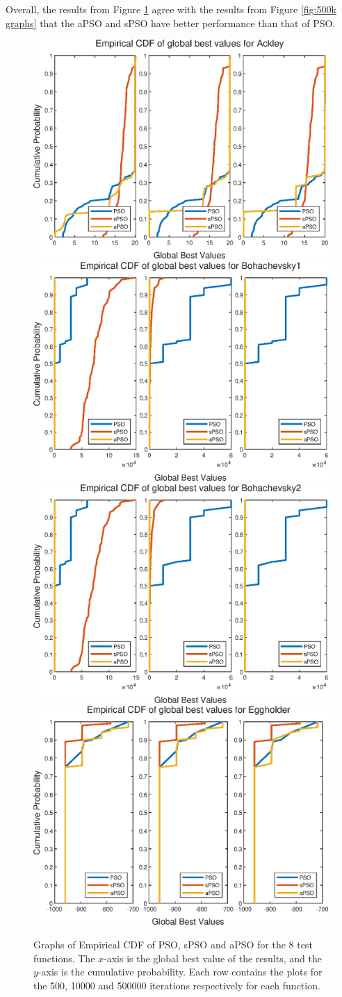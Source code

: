 \documentclass[12pt]{article}
\theoremstyle{definition}
\begin{document}
Overall, the results from Figure \ref{fig:ecdf graphs} agree with the results from Figure \ref{fig:500k graphs} that the aPSO and sPSO have better performance than that of PSO.

\begin{figure}[H]
    \centering
    \includegraphics[height=0.33\textwidth,width=\textwidth]{ecdfs/Ackley_500k.eps} \\ \bigskip
    \includegraphics[height=0.33\textwidth,width=\textwidth]{ecdfs/Bohachevsky1_500k.eps} \\ \bigskip
    \includegraphics[height=0.33\textwidth,width=\textwidth]{ecdfs/Bohachevsky2_500k.eps} \\ \bigskip
    \includegraphics[height=0.33\textwidth,width=\textwidth]{ecdfs/Eggholder_500k.eps}
    \caption{Graphs of Empirical CDF of PSO, sPSO and aPSO for the 8 test functions. The $x$-axis is the global best value of the results, and the $y$-axis is the cumulative probability. Each row contains the plots for the 500, 10000 and 500000 iterations respectively for each function.}
    \label{fig:ecdf graphs}
\end{figure}
    
\end{document}
